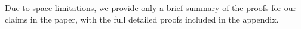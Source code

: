 Due to space limitations, we provide only a brief summary of the proofs for our claims in the paper, with the full detailed proofs included in the appendix.

